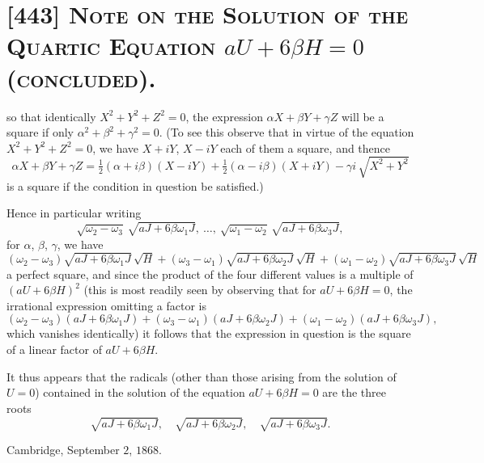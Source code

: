 \documentclass[11pt,a4paper]{article}
\begin{document}
\section*{[443] \textsc{Note on the Solution of the Quartic Equation $aU + 6\beta H = 0$ (concluded).}}

\medskip

\noindent so that identically $X^2 + Y^2 + Z^2 = 0$, the expression $\alpha X + \beta Y + \gamma Z$
will be a square if only $\alpha^2 + \beta^2 + \gamma^2 = 0$. (To see this observe that
in virtue of the equation $X^2 + Y^2 + Z^2 = 0$, we have $X + iY$, $X - iY$ each of them
a square, and thence
\[
\alpha X + \beta Y + \gamma Z
   = \tfrac{1}{2}(\alpha + i\beta)(X - iY)
   + \tfrac{1}{2}(\alpha - i\beta)(X + iY) - \gamma i\,\sqrt{X^2 + Y^2}
\]
is a square if the condition in question be satisfied.)

\medskip

Hence in particular writing
\[
\sqrt{\omega_2 - \omega_3}\,\sqrt{aJ + 6\beta\omega_1 J},\ \ldots,\ \sqrt{\omega_1 - \omega_2}\,\sqrt{aJ + 6\beta\omega_3 J},
\]
for $\alpha$, $\beta$, $\gamma$, we have
\[
(\omega_2 - \omega_3)\sqrt{aJ + 6\beta\omega_1 J}\,\sqrt{H} + (\omega_3 - \omega_1)\sqrt{aJ + 6\beta\omega_2 J}\,\sqrt{H}
+ (\omega_1 - \omega_2)\sqrt{aJ + 6\beta\omega_3 J}\,\sqrt{H}
\]
a perfect square, and since the product of the four different values is a multiple of
$(aU + 6\beta H)^2$ (this is most readily seen by observing that for $aU + 6\beta H = 0$, the
irrational expression omitting a factor is
\[
(\omega_2 - \omega_3)(aJ + 6\beta\omega_1 J) + (\omega_3 - \omega_1)(aJ + 6\beta\omega_2 J)
+ (\omega_1 - \omega_2)(aJ + 6\beta\omega_3 J),
\]
which vanishes identically) it follows that the expression in question is the square of
a linear factor of $aU + 6\beta H$.

\medskip

It thus appears that the radicals (other than those arising from the solution of $U = 0$)
contained in the solution of the equation $aU + 6\beta H = 0$ are the three roots
\[
\sqrt{aJ + 6\beta\omega_1 J},\quad \sqrt{aJ + 6\beta\omega_2 J},\quad \sqrt{aJ + 6\beta\omega_3 J}.
\]

\medskip

\noindent\hspace*{1em}Cambridge, September $2$, $1868$.
\end{document}
